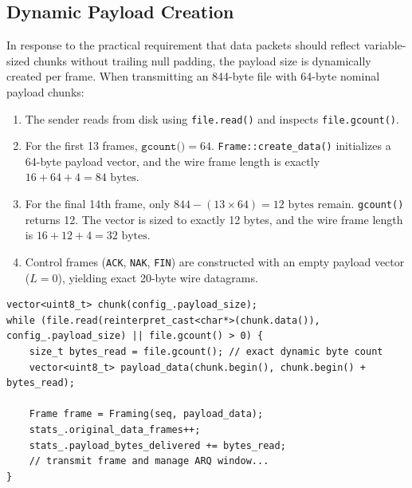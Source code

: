 \documentclass[11pt,a4paper]{article}
\begin{document}
\subsection{Dynamic Payload Creation}
In response to the practical requirement that data packets should reflect variable-sized chunks without trailing null padding, the payload size is dynamically created per frame. 
When transmitting an 844-byte file with 64-byte nominal payload chunks:
\begin{enumerate}
    \item The sender reads from disk using \texttt{file.read()} and inspects \texttt{file.gcount()}.
    \item For the first 13 frames, $\texttt{gcount()} = 64$. \texttt{Frame::create\_data()} initializes a 64-byte payload vector, and the wire frame length is exactly $16 + 64 + 4 = 84\text{ bytes}$.
    \item For the final 14th frame, only $844 - (13 \times 64) = 12\text{ bytes}$ remain. \texttt{gcount()} returns 12. The vector is sized to exactly 12 bytes, and the wire frame length is $16 + 12 + 4 = 32\text{ bytes}$.
    \item Control frames (\texttt{ACK}, \texttt{NAK}, \texttt{FIN}) are constructed with an empty payload vector ($L = 0$), yielding exact 20-byte wire datagrams.
\end{enumerate}

\begin{lstlisting}[caption={Dynamic Chunking and Frame Dispatch (\texttt{src/stop\_and\_wait.cpp})}]
vector<uint8_t> chunk(config_.payload_size);
while (file.read(reinterpret_cast<char*>(chunk.data()), config_.payload_size) || file.gcount() > 0) {
    size_t bytes_read = file.gcount(); // exact dynamic byte count
    vector<uint8_t> payload_data(chunk.begin(), chunk.begin() + bytes_read);

    Frame frame = Framing(seq, payload_data);
    stats_.original_data_frames++;
    stats_.payload_bytes_delivered += bytes_read;
    // transmit frame and manage ARQ window...
}
\end{lstlisting}
\end{document}
